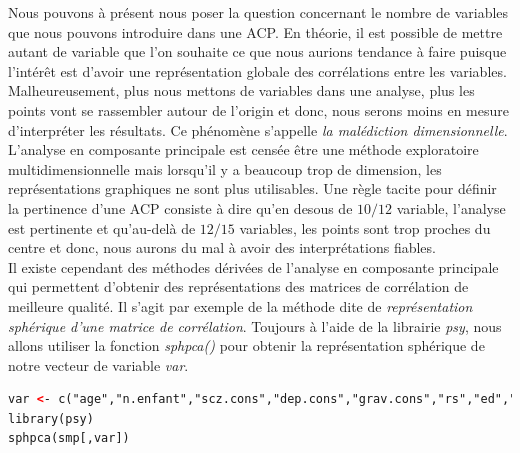 Nous pouvons à présent nous poser la question concernant le nombre de variables que nous pouvons introduire dans une ACP. En théorie, il est possible de mettre autant de variable que l'on souhaite ce que nous aurions tendance à faire puisque l'intérêt est d'avoir une représentation globale des corrélations entre les variables. Malheureusement, plus nous mettons de variables dans une analyse, plus les points vont se rassembler autour de l'origin et donc, nous serons moins en mesure d'interpréter les résultats. Ce phénomène s'appelle \textit{la malédiction dimensionnelle}. L'analyse en composante principale est censée être une méthode exploratoire multidimensionnelle mais lorsqu'il y a beaucoup trop de dimension, les représentations graphiques ne sont plus utilisables.\newline
Une règle tacite pour définir la pertinence d'une ACP consiste à dire qu'en desous de $10/12$ variable, l'analyse est pertinente et qu'au-delà de $12/15$ variables, les points sont trop proches du centre et donc, nous aurons du mal à avoir des interprétations fiables.\newline
\\
Il existe cependant des méthodes dérivées de l'analyse en composante principale qui permettent d'obtenir des représentations des matrices de corrélation de meilleure qualité. Il s'agit par exemple de la méthode dite de \textit{représentation sphérique d'une matrice de corrélation}.\newline
Toujours à l'aide de la librairie \textit{psy}, nous allons utiliser la fonction \textit{sphpca()} pour obtenir la représentation sphérique de notre vecteur de variable \textit{var}.

\begin{lstlisting}[language=html]
var <- c("age","n.enfant","scz.cons","dep.cons","grav.cons","rs","ed","dr");var
library(psy)
sphpca(smp[,var])
\end{lstlisting}

